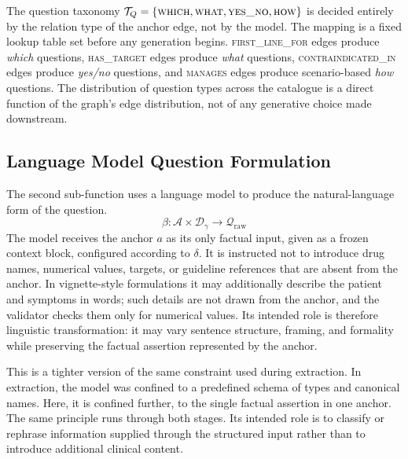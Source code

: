 The question taxonomy $\mathcal{T}_Q = \{\textsc{which}, \textsc{what}, \textsc{yes\_no}, \textsc{how}\}$ is decided entirely by the relation type of the anchor edge, not by the model. The mapping is a fixed lookup table set before any generation begins. \textsc{first\_line\_for} edges produce \textit{which} questions, \textsc{has\_target} edges produce \textit{what} questions, \textsc{contraindicated\_in} edges produce \textit{yes/no} questions, and \textsc{manages} edges produce scenario-based \textit{how} questions. The distribution of question types across the catalogue is a direct function of the graph's edge distribution, not of any generative choice made downstream.

\subsection{Language Model Question Formulation}
\label{sec:formulation}

The second sub-function uses a language model to produce the natural-language form of the question.
$$\beta: \mathcal{A} \times \mathcal{D}_\gamma \rightarrow \mathcal{Q}_{\text{raw}}$$
The model receives the anchor $a$ as its only factual input, given as a frozen context block, configured according to $\delta$. It is instructed not to introduce drug names, numerical values, targets, or guideline references that are absent from the anchor. In vignette-style formulations it may additionally describe the patient and symptoms in words; such details are not drawn from the anchor, and the validator checks them only for numerical values. Its intended role is therefore linguistic transformation: it may vary sentence structure, framing, and formality while preserving the factual assertion represented by the anchor.

This is a tighter version of the same constraint used during extraction. In extraction, the model was confined to a predefined schema of types and canonical names. Here, it is confined further, to the single factual assertion in one anchor. The same principle runs through both stages. Its intended role is to classify or rephrase information supplied through the structured input rather than to introduce additional clinical content.

